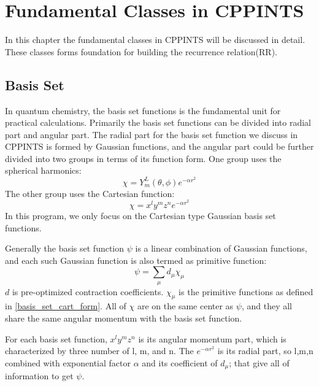 %
% 
%
\chapter{Fundamental Classes in CPPINTS}
%
%
%
In this chapter the fundamental classes in CPPINTS will be discussed in 
detail. These classes forms foundation for building the recurrence
relation(RR).

\section{Basis Set}
%
%
\label{bs}

In quantum chemistry, the basis set functions is the fundamental 
unit for practical calculations\cite{Davidson_Feller_CR_86_681_1986}. 
Primarily the basis set functions can be divided into radial part
and angular part. The radial part for the basis set function we discuss
in CPPINTS is formed by Gaussian functions, and the angular part could 
be further divided into two groups in terms of its function form.  
One group uses the spherical harmonics:
\begin{equation}
 \chi = Y_{m}^{L}(\theta,\phi)e^{-\alpha r^{2}}
\end{equation}
The other group uses the Cartesian function:
\begin{equation}\label{basis_set_cart_form}
 \chi = x^{l}y^{m}z^{n}e^{-\alpha r^{2}}
\end{equation}
In this program, we only focus on the Cartesian type
Gaussian basis set functions.

Generally the basis set function $\psi$ is a linear combination of 
Gaussian functions, and each such Gaussian function is also termed
as primitive function:
\begin{equation}\label{program_contract_basis_set}
	\psi = \sum_{\mu}d_{\mu}\chi_{\mu}
\end{equation}
$d$ is pre-optimized contraction coefficients.
$\chi_{\mu}$ is the primitive 
functions as defined in \ref{basis_set_cart_form}.
All of $\chi$ are on the same center as $\psi$, and they all share the 
same angular momentum with the basis set function.

For each basis set function, $x^{l}y^{m}z^{n}$ is its angular momentum part,
which is characterized by three number of l, m, and n. The $e^{-\alpha r^{2}}$
is its radial part, so l,m,n combined with exponential factor $\alpha$ and 
its coefficient of $d_{\mu}$; that give all of information to get $\psi$.

